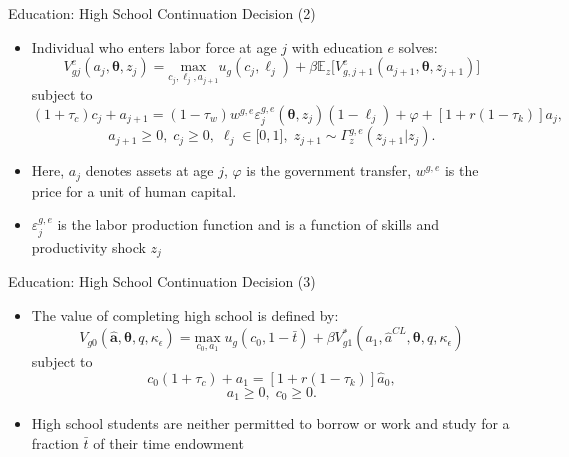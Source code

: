\documentclass{beamer}
\begin{document}
\begin{frame}{Education: High School Continuation Decision (2)}
\begin{itemize}
  \item Individual who enters labor force at age $j$ with education $e$ solves:
  		$$V^e_{gj}(a_j,\boldsymbol{\theta},z_j) = \underset{c_j,\ell_j,a_{j+1}}{\mathrm{max}}u_g(c_j,			\ell_j)+\beta\mathbb{E}_z\big[V^e_{g,j+1}(a_{j+1},\boldsymbol{\theta},z_{j+1})\big]$$
        subject to
        $$(1+\tau_c)c_j+a_{j+1} = (1-\tau_w)w^{g,e}\varepsilon^{g,e}_j(\boldsymbol{\theta},z_j)					(1-\ell_j)+\varphi+[1+r(1-\tau_k)]a_j,$$
        $$a_{j+1}\geq0,\;c_j\geq0,\;\ell_j\in\big[0,1\big],\;z_{j+1}\sim\Gamma^{g,e}_z(z_{j+1}|z_j).$$        
  \item Here, $a_j$ denotes assets at age $j$, $\varphi$ is the government transfer, $w^{g,e}$ is the 			price for a unit of human capital.
  \item $\varepsilon^{g,e}_j$ is the labor production function and is a function of skills and 					productivity shock $z_j$
\end{itemize}      
\end{frame} 

\begin{frame}{Education: High School Continuation Decision (3)}
\begin{itemize}
  \item The value of completing high school is defined by:
 		$$V_{g0}(\hat{\textbf{a}},\boldsymbol{\theta},q,\kappa_{\epsilon}) = \underset{c_0,a_1}					{\mathrm{max}}\;u_g(c_0,1-\bar{t})+\beta{V}^{*}_{g1}(a_1,\hat{a}^{CL},\boldsymbol{\theta},q,			\kappa_{\epsilon})$$
        subject to
        $$c_0(1+\tau_c) + a_1 = [1+r(1-\tau_k)]\hat{a}_0,$$
        $$a_1\geq0,\;c_0\geq0.$$
  \item High school students are neither permitted to borrow or work and study for a fraction $\bar{t}$ 		of their time endowment
\end{itemize}      
\end{frame} 
\end{document}
